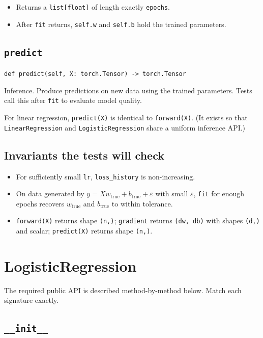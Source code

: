 \documentclass[11pt]{article}
\newcommand{\code}[1]{\texttt{\small #1}}
\begin{document}
\begin{itemize}
    \item Returns a \code{list[float]} of length exactly \code{epochs}.
    \item After \code{fit} returns, \code{self.w} and \code{self.b} hold the
          trained parameters.
\end{itemize}

\subsection{\texttt{predict}}

\noindent
\code{def predict(self, X: torch.Tensor) -> torch.Tensor}

\medskip\noindent
Inference. Produce predictions on new data using the trained
parameters. Tests call this after \code{fit} to evaluate model quality.

\medskip\noindent
For linear regression, \code{predict(X)} is identical to \code{forward(X)}.
(It exists so that \code{LinearRegression} and \code{LogisticRegression} share
a uniform inference API.)

\subsection*{Invariants the tests will check}

\begin{itemize}
    \item For sufficiently small \code{lr}, \code{loss\_history} is non-increasing.
    \item On data generated by $y = X w_{\text{true}} + b_{\text{true}} + \varepsilon$
          with small $\varepsilon$, \code{fit} for enough epochs recovers
          $w_{\text{true}}$ and $b_{\text{true}}$ to within tolerance.
    \item \code{forward(X)} returns shape \code{(n,)}; \code{gradient} returns
          \code{(dw, db)} with shapes \code{(d,)} and scalar; \code{predict(X)}
          returns shape \code{(n,)}.
\end{itemize}

\section{LogisticRegression}

The required public API is described method-by-method below. Match each
signature exactly.

\subsection{\texttt{\_\_init\_\_}}
\end{document}
